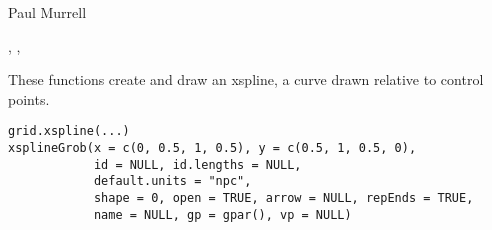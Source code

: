 %
\begin{Author}\relax
Paul Murrell
\end{Author}
%
\begin{SeeAlso}\relax
{},
,
\end{SeeAlso}
%
\begin{Description}\relax
These functions create and draw an xspline, a curve drawn
relative to control points.
\end{Description}
%
\begin{Usage}
\begin{verbatim}
grid.xspline(...)
xsplineGrob(x = c(0, 0.5, 1, 0.5), y = c(0.5, 1, 0.5, 0),
            id = NULL, id.lengths = NULL,
            default.units = "npc",
            shape = 0, open = TRUE, arrow = NULL, repEnds = TRUE,
            name = NULL, gp = gpar(), vp = NULL)
\end{verbatim}
\end{Usage}
%
